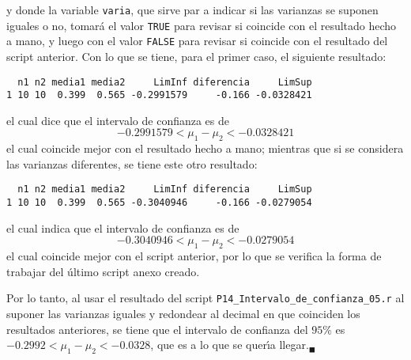 \begin{solucion}
 \vspace{-0.5cm}
 y donde la variable \texttt{varia}, que sirve par a indicar si las varianzas se suponen iguales o no, tomar\'a el valor \texttt{TRUE} para revisar si coincide con el resultado hecho a mano, y luego con el valor \texttt{FALSE} para revisar si coincide con el resultado del script anterior. Con lo que se tiene, para el primer caso, el siguiente resultado:
 \begin{verbatim}
  n1 n2 media1 media2     LimInf diferencia     LimSup
1 10 10  0.399  0.565 -0.2991579     -0.166 -0.0328421  
 \end{verbatim}
 \vspace{-0.5cm}
 el cual dice que el intervalo de confianza es de
 \begin{equation*}
  -0.2991579 < \mu_1 - \mu_2 < -0.0328421
 \end{equation*}
 el cual coincide mejor con el resultado hecho a mano; mientras que si se considera las varianzas diferentes, se tiene este otro resultado:
 \begin{verbatim}
  n1 n2 media1 media2     LimInf diferencia     LimSup
1 10 10  0.399  0.565 -0.3040946     -0.166 -0.0279054
 \end{verbatim}
 \vspace{-0.5cm}
 el cual indica que el intervalo de confianza es de
 \begin{equation*}
  -0.3040946 < \mu_1 - \mu_2 < -0.0279054
 \end{equation*}
 el cual coincide mejor con el script anterior, por lo que se verifica la forma de trabajar del \'ultimo script anexo creado.
 \par 
 Por lo tanto, al usar el resultado del script \texttt{P14\_Intervalo\_de\_confianza\_05.r} al suponer las varianzas iguales y redondear al decimal en que coinciden los resultados anteriores, se tiene que el intervalo de confianza del $95\%$ es $-0.2992 < \mu_1 - \mu_2 < -0.0328$, que es a lo que se quer\'{\i}a llegar.${}_{\blacksquare}$
\end{solucion}
